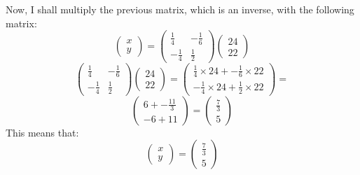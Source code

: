 \documentclass[a4paper,10pt]{article}
\begin{document}
      Now, I shall multiply the previous matrix, which is an inverse, with the following matrix:
      \begin{equation*}
         \begin{pmatrix}
           x\\y
         \end{pmatrix}
         =
         \begin{pmatrix}
           \frac{1}{4} & -\frac{1}{6}\\-\frac{1}{4} & \frac{1}{2}
         \end{pmatrix}
         \begin{pmatrix}
           24\\22
         \end{pmatrix}

      \end{equation*}
      \begin{equation*}
        \begin{pmatrix}
          \frac{1}{4} & -\frac{1}{6}\\-\frac{1}{4} & \frac{1}{2}
        \end{pmatrix}
        \begin{pmatrix}
          24\\22
        \end{pmatrix}
         =
        \begin{pmatrix}
          \frac{1}{4} \times 24 + -\frac{1}{6} \times 22\\
          -\frac{1}{4} \times 24 + \frac{1}{2} \times 22
        \end{pmatrix}
         =
      \end{equation*}
      \begin{equation*}
        \begin{pmatrix}
          6 + -\frac{11}{3}\\
          -6 + 11
        \end{pmatrix}
         =
        \begin{pmatrix}
          \frac{7}{3}\\5
        \end{pmatrix}
      \end{equation*}
      This means that:
      \begin{equation*}
        \begin{pmatrix}
          x\\y
        \end{pmatrix}
         =
        \begin{pmatrix}
          \frac{7}{3}\\5
        \end{pmatrix}
      \end{equation*}
\end{document}
